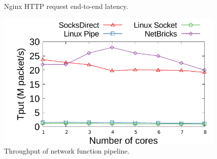 \begin{figure}[t!]
\begin{minipage}{.31\textwidth}
		\vspace{-15pt}
		\caption{Nginx HTTP request end-to-end latency.}
		\label{fig:eval-nginx}
	\end{minipage}
	\hspace{0.02\textwidth}
	\begin{minipage}{.31\textwidth}
		\centering
		\includegraphics[width=\textwidth]{eval/microbenchmark/nfv-tun-tput.pdf}
		\vspace{-15pt}
		\caption{Throughput of network function pipeline.}
		\label{fig:eval-tun-tput}
		
		
	\end{minipage}
	\vspace{-5pt}
\end{figure}

\begin{figure}[t!]
	\centering

	\hspace{0.01\textwidth}
		

	\vspace{-15pt}
\end{figure}

